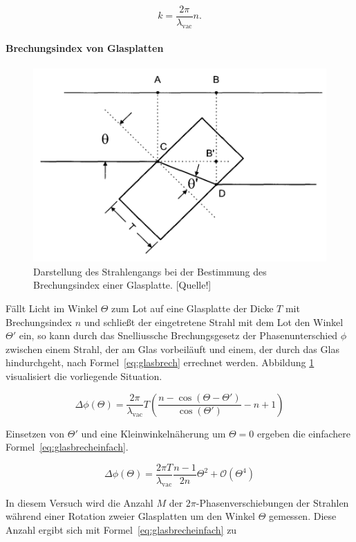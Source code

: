\begin{equation*}
k = \frac{2\pi}{\lambda_\text{vac}}n.
\end{equation*}

\paragraph{Brechungsindex von Glasplatten}
\begin{figure}
\centering
\includegraphics[width=0.7\linewidth]{img/slab.png}
\caption{Darstellung des Strahlengangs bei der Bestimmung des Brechungsindex einer Glasplatte. [Quelle!]}
\label{fig:slab}
\end{figure}

Fällt Licht im Winkel $\Theta$ zum Lot auf eine Glasplatte der Dicke $T$ mit Brechungsindex $n$ und schließt der eingetretene Strahl mit dem Lot den Winkel $\Theta'$ ein, so kann durch das Snelliussche Brechungsgesetz der Phasenunterschied $\phi$ zwischen einem Strahl, der am Glas vorbeiläuft und einem, der durch das Glas hindurchgeht, nach Formel~\eqref{eq:glasbrech} errechnet werden. Abbildung \ref{fig:slab} visualisiert die vorliegende Situation.

\begin{equation}
\Delta\phi(\Theta) = \frac{2\pi}{\lambda_\text{vac}}T\left(
\frac{n-\cos(\Theta - \Theta')}{\cos(\Theta')} - n+1\right)
\label{eq:glasbrech}
\end{equation}

Einsetzen von $\Theta'$ und eine Kleinwinkelnäherung um $\Theta = 0$ ergeben die einfachere Formel~\eqref{eq:glasbrecheinfach}.

\begin{equation}
\Delta\phi(\Theta) = \frac{2\pi T}{\lambda_\text{vac}}
\frac{n-1}{2n}\Theta^2 + \mathcal{O}(\Theta^4)
\label{eq:glasbrecheinfach}
\end{equation}

In diesem Versuch wird die Anzahl $M$ der $2\pi$-Phasenverschiebungen der Strahlen während einer Rotation zweier Glasplatten um den Winkel $\Theta$ gemessen. Diese Anzahl ergibt sich mit Formel~\eqref{eq:glasbrecheinfach} zu

